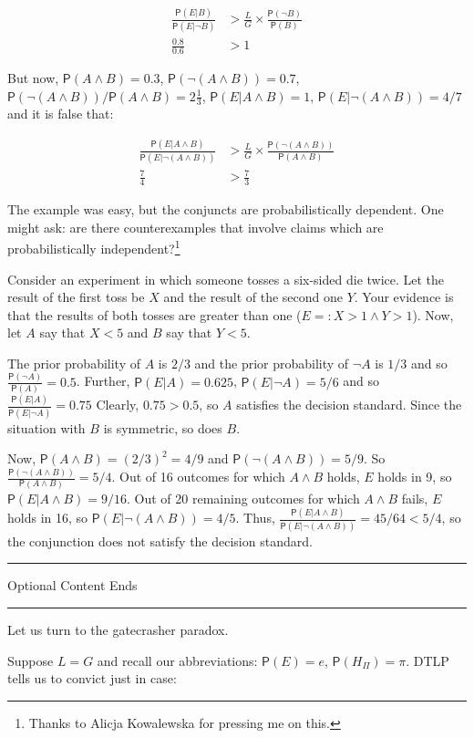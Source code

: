 \documentclass[10pt,dvipsnames,enabledeprecatedfontcommands]{scrartcl}
\newcommand{\n}{\neg}
\newcommand{\et}{\wedge}
\newcommand{\pr}[1]{\mathsf{P}(#1)}
\newcommand{\intermezzob}{\nopagebreak 
	\begin{minipage}[c]{13cm}
	\begin{center}\rule{10cm}{0.4pt}

	\tiny{\sc Optional Content Ends}
	
	\vspace{-1mm}
	
	\rule{10cm}{0.4pt}\end{center}
	\end{minipage}
	}
\begin{document}
\begin{align*}
 \frac{\pr{E\vert B}}{\pr{E\vert \n B}}&> \frac{L}{G}\times \frac{\pr{\n B}}{\pr{B}}\\
 \frac{0.8}{0.6} & > 1 
 \end{align*}

But now, \(\pr{A\et B}=0.3\), \(\pr{\n (A \et B)}=0.7\),
\(\pr{\n (A\et B)}/\pr{A\et B}=2\frac{1}{3}\),
\(\pr{E\vert A \et B}=1\), \(\pr{E\vert \n (A\et B)}=4/7\) and it is
false that:

\begin{align*}
 \frac{\pr{E\vert A \et B}}{\pr{E\vert \n (A\et B)}}&> \frac{L}{G}\times \frac{\pr{\n (A \et B)}}{\pr{A \et B}}\\
 \frac{7}{4} & > \frac{7}{3} 
 \end{align*}

The example was easy, but the conjuncts are probabilistically dependent.
One might ask: are there counterexamples that involve claims which are
probabilistically
independent?\footnote{Thanks to Alicja Kowalewska for pressing me on this.}

Consider an experiment in which someone tosses a six-sided die twice.
Let the result of the first toss be \(X\) and the result of the second
one \(Y\). Your evidence is that the results of both tosses are greater
than one (\(E=: X>1 \et Y>1\)). Now, let \(A\) say that \(X<5\) and
\(B\) say that \(Y<5\).

The prior probability of \(A\) is \(2/3\) and the prior probability of
\(\n A\) is \(1/3\) and so \(\frac{\pr{\n A}}{\pr{A}}=0.5\). Further,
\(\pr{E\vert A}=0.625\), \(\pr{E\vert \n A}= 5/6\) and so
\(\frac{\pr{E\vert A}}{\pr{E\vert \n A}}=0.75\) Clearly, \(0.75>0.5\),
so \(A\) satisfies the decision standard. Since the situation with \(B\)
is symmetric, so does \(B\).

Now, \(\pr{A\et B}=(2/3)^2=4/9\) and \(\pr{\n (A\et B)}=5/9\). So
\(\frac{\pr{\n(A\et B)}}{\pr{A\et B}}=5/4\). Out of 16 outcomes for
which \(A\et B\) holds, \(E\) holds in 9, so
\(\pr{E\vert A\et B}=9/16\). Out of 20 remaining outcomes for which
\(A\et B\) fails, \(E\) holds in 16, so \(\pr{E\vert \n (A\et B)}=4/5\).
Thus, \(\frac{\pr{E\vert A\et B}}{\pr{E\vert \n (A\et B)}}=45/64 <5/4\),
so the conjunction does not satisfy the decision standard.

\intermezzob

Let us turn to the gatecrasher paradox.

Suppose \(L=G\) and recall our abbreviations: \(\pr{E}=e\),
\(\pr{H_\Pi}=\pi\). DTLP tells us to convict just in case:
\end{document}
